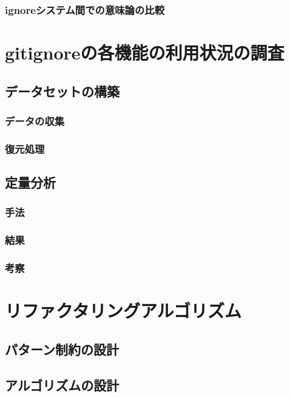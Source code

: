 \documentclass[xelatex,ja=standard,fontsize=10.5pt]{bxjsreport}
\begin{document}
\subsection{\textrm{ignore}システム間での意味論の比較}

%
\chapter{\textrm{gitignore}の各機能の利用状況の調査}

\section{データセットの構築}

\subsection{データの収集}

\subsection{復元処理}

\section{定量分析}

\subsection{手法}

\subsection{結果}

\subsection{考察}

%
\chapter{リファクタリングアルゴリズム}

\section{パターン制約の設計}

\section{アルゴリズムの設計}
\end{document}
